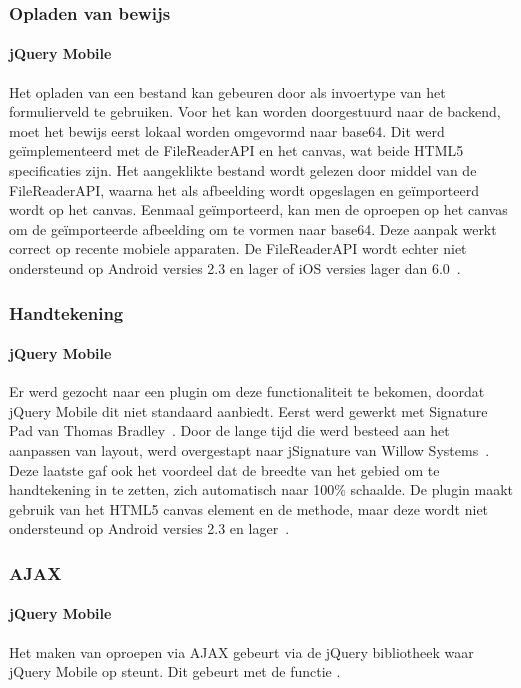 \subsubsection{Opladen van bewijs}

\paragraph{jQuery Mobile} 
Het opladen van een bestand kan gebeuren door  als invoertype van het formulierveld te gebruiken. Voor het kan worden doorgestuurd naar de backend, moet het bewijs eerst lokaal worden omgevormd naar base64. Dit werd geïmplementeerd met de FileReaderAPI en het canvas, wat beide HTML5 specificaties zijn. Het aangeklikte bestand wordt gelezen door middel van de FileReaderAPI, waarna het als afbeelding wordt opgeslagen en geïmporteerd wordt op het canvas. Eenmaal geïmporteerd, kan men de  oproepen op het canvas om de geïmporteerde afbeelding om te vormen naar base64. Deze aanpak werkt correct op recente mobiele apparaten. De FileReaderAPI wordt echter niet ondersteund op Android versies 2.3 en lager of iOS versies lager dan 6.0~\cite{Deveria2013a}.

\subsubsection{Handtekening}

\paragraph{jQuery Mobile} 
Er werd gezocht naar een plugin om deze functionaliteit te bekomen, doordat jQuery Mobile dit niet standaard aanbiedt. Eerst werd gewerkt met Signature Pad van Thomas Bradley~\cite{Bradley2013}. Door de lange tijd die werd besteed aan het aanpassen van layout, werd overgestapt naar jSignature van Willow Systems~\cite{Systems2013}. Deze laatste gaf ook het voordeel dat de breedte van het gebied om te handtekening in te zetten, zich automatisch naar 100\% schaalde. De plugin maakt gebruik van het HTML5 canvas element en de  methode, maar deze wordt niet ondersteund op Android versies 2.3 en lager~\cite{Systems2013}.

\subsubsection{AJAX}

\paragraph{jQuery Mobile} 
Het maken van oproepen via AJAX gebeurt via de jQuery bibliotheek waar jQuery Mobile op steunt. Dit gebeurt met de functie . 

